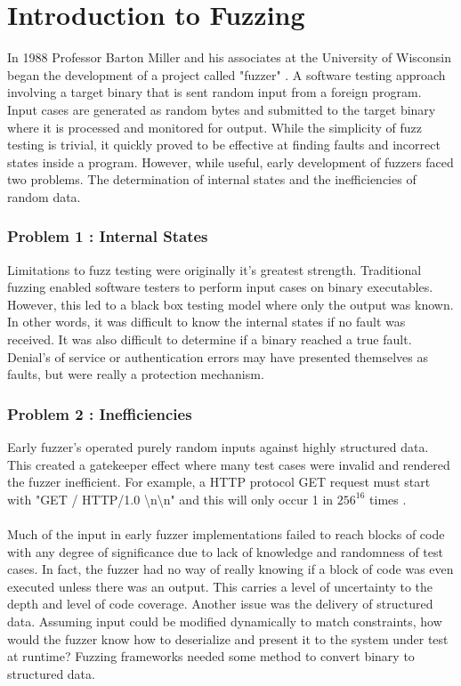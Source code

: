 \chapter{Introduction to Fuzzing}

In 1988 Professor Barton Miller and his associates at the University of Wisconsin began the development of a project called "fuzzer" \cite{mil-fuzz}. A software testing approach involving a target binary that is sent random input from a foreign program.
 Input cases are generated as random bytes and submitted to the target binary where it is processed and monitored for output. While the simplicity of fuzz testing is trivial, it quickly proved to be effective at finding faults and incorrect states inside a program. 
However, while useful, early development of fuzzers faced two problems. The determination of internal states and the inefficiencies of random data.

\subsection{Problem 1 : Internal States}
Limitations to fuzz testing were originally it's greatest strength. Traditional fuzzing enabled software testers to perform input cases on binary executables. 
However, this led to a black box testing model where only the output was known.  In other words, it was difficult to know the internal states if no fault was received. It was also difficult to determine
if a binary reached a true fault. Denial's of service or authentication errors may have presented themselves as faults, but were really a protection mechanism.

\subsection{Problem 2 :  Inefficiencies}
Early fuzzer's operated purely random inputs against highly structured data. This created a gatekeeper effect where many test cases were invalid and rendered the fuzzer inefficient. 
For example, a HTTP protocol GET request  must start with "GET / HTTP/1.0 \textbackslash n\textbackslash n" and this will only occur 1 in $256^{16}$ times \cite{mil-fuzz}. 
\\\\
Much of the input in early fuzzer implementations failed to reach blocks of code with any degree of significance due to lack of knowledge and randomness of test cases. In fact, the fuzzer had no way of really knowing if a block of code was even executed
unless there was an output. This carries a level of uncertainty to the depth and level of code coverage.  Another issue was the delivery of structured data. Assuming input could be modified
dynamically to match constraints, how would the fuzzer know how to deserialize and present it to the system under test at runtime? Fuzzing frameworks needed some method to convert binary to structured data. 